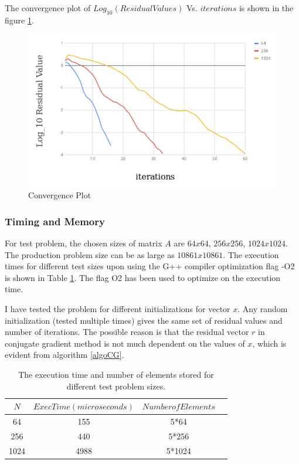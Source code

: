 \documentclass{article}
\begin{document}
\begin{spacing}{1.1}
The convergence plot of $Log_{10}(Residual Values)$ Vs. $iterations$ is shown in the figure \ref{convPlot}.
\begin{center}
	\begin{figure}[H]
	\centering
       \includegraphics[scale=.40]{convergence.png}
        \caption{\label{convPlot} Convergence Plot} 
	\end{figure}
\end{center}


\subsubsection*{Timing and Memory}
For test problem, the chosen sizes of matrix $A$ are $64x64$, $256x256$, $1024x1024$. The production problem size can be as large as $10861x10861$. 
The execution times for different test sizes upon using the G++ compiler optimization flag -O2 is shown in Table \ref{exec_iter}. The flag O2 has been used to optimize on the execution time.

I have tested the problem for different initializations for vector $x$. Any random initialization (tested multiple times) gives the same set of residual values and number of iterations. The possible reason is that the residual vector $r$ in conjugate gradient method is not much dependent on the values of $x$, which is evident from algorithm \eqref{algoCG}.

\begin{table}[H]
\begin{center}
 \begin{tabular}{| c | c|c|c|} 
 \hline
$N$ & $ExecTime (microseconds)$ & $Number of Elements$  \\ %
 \hline
64 & 155 & 5*64\\ %
256 &  440 & 5*256\\ %
1024 &  4988 & 5*1024\\ %
 \hline
\end{tabular}%
\end{center}
\caption{\label{exec_iter} The execution time and number of elements stored for different test problem sizes.  } 
\end{table}


\end{spacing}
\end{document}
